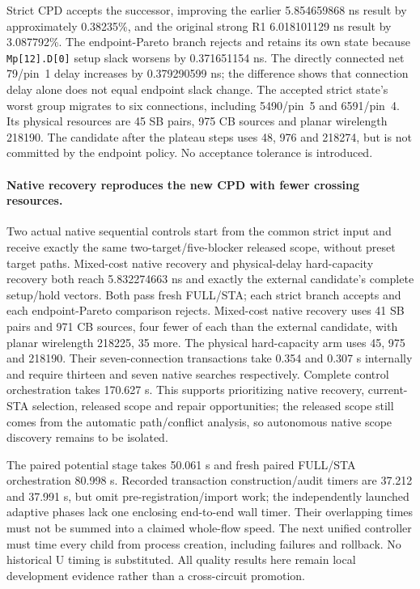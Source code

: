 Strict CPD accepts the successor, improving the earlier 5.854659868 ns result by approximately 0.38235\%, and the original strong R1 6.018101129 ns result by 3.087792\%. The endpoint-Pareto branch rejects and retains its own state because \texttt{Mp[12].D[0]} setup slack worsens by 0.371651154 ns. The directly connected net 79/pin~1 delay increases by 0.379290599 ns; the difference shows that connection delay alone does not equal endpoint slack change. The accepted strict state's worst group migrates to six connections, including 5490/pin~5 and 6591/pin~4. Its physical resources are 45 SB pairs, 975 CB sources and planar wirelength 218190. The candidate after the plateau steps uses 48, 976 and 218274, but is not committed by the endpoint policy. No acceptance tolerance is introduced.

\paragraph{Native recovery reproduces the new CPD with fewer crossing resources.}
Two actual native sequential controls start from the common strict input and receive exactly the same two-target/five-blocker released scope, without preset target paths. Mixed-cost native recovery and physical-delay hard-capacity recovery both reach 5.832274663 ns and exactly the external candidate's complete setup/hold vectors. Both pass fresh FULL/STA; each strict branch accepts and each endpoint-Pareto comparison rejects. Mixed-cost native recovery uses 41 SB pairs and 971 CB sources, four fewer of each than the external candidate, with planar wirelength 218225, 35 more. The physical hard-capacity arm uses 45, 975 and 218190. Their seven-connection transactions take 0.354 and 0.307 s internally and require thirteen and seven native searches respectively. Complete control orchestration takes 170.627 s. This supports prioritizing native recovery, current-STA selection, released scope and repair opportunities; the released scope still comes from the automatic path/conflict analysis, so autonomous native scope discovery remains to be isolated.

The paired potential stage takes 50.061 s and fresh paired FULL/STA orchestration 80.998 s. Recorded transaction construction/audit timers are 37.212 and 37.991 s, but omit pre-registration/import work; the independently launched adaptive phases lack one enclosing end-to-end wall timer. Their overlapping times must not be summed into a claimed whole-flow speed. The next unified controller must time every child from process creation, including failures and rollback. No historical U timing is substituted. All quality results here remain local development evidence rather than a cross-circuit promotion.
